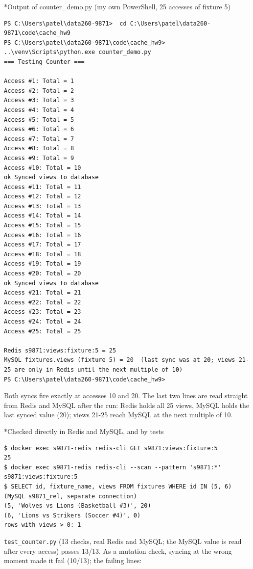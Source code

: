 \documentclass[11pt]{article}
\makeatletter
\renewcommand\subsection{\@startsection{subsection}{2}{\z@}{-2.2ex \@plus -1ex \@minus -.2ex}{0.8ex \@plus.2ex}{\normalfont\fontsize{12}{14.5}\selectfont\bfseries}}
\makeatother
\begin{document}
\subsection*{Output of counter\_demo.py (my own PowerShell, 25 accesses of fixture 5)}
\begingroup\lstset{basicstyle=\ttfamily\tiny}
\begin{lstlisting}
PS C:\Users\patel\data260-9871>  cd C:\Users\patel\data260-9871\code\cache_hw9
PS C:\Users\patel\data260-9871\code\cache_hw9> ..\venv\Scripts\python.exe counter_demo.py
=== Testing Counter ===

Access #1: Total = 1
Access #2: Total = 2
Access #3: Total = 3
Access #4: Total = 4
Access #5: Total = 5
Access #6: Total = 6
Access #7: Total = 7
Access #8: Total = 8
Access #9: Total = 9
Access #10: Total = 10
ok Synced views to database
Access #11: Total = 11
Access #12: Total = 12
Access #13: Total = 13
Access #14: Total = 14
Access #15: Total = 15
Access #16: Total = 16
Access #17: Total = 17
Access #18: Total = 18
Access #19: Total = 19
Access #20: Total = 20
ok Synced views to database
Access #21: Total = 21
Access #22: Total = 22
Access #23: Total = 23
Access #24: Total = 24
Access #25: Total = 25

Redis s9871:views:fixture:5 = 25
MySQL fixtures.views (fixture 5) = 20  (last sync was at 20; views 21-25 are only in Redis until the next multiple of 10)
PS C:\Users\patel\data260-9871\code\cache_hw9>
\end{lstlisting}
\endgroup
Both syncs fire exactly at accesses 10 and 20. The last two lines are read straight from Redis and MySQL after the run: Redis holds all 25 views, MySQL holds the last synced value (20); views 21-25 reach MySQL at the next multiple of 10.

\subsection*{Checked directly in Redis and MySQL, and by tests}
\begingroup\lstset{basicstyle=\ttfamily\tiny}
\begin{lstlisting}
$ docker exec s9871-redis redis-cli GET s9871:views:fixture:5
25
$ docker exec s9871-redis redis-cli --scan --pattern 's9871:*'
s9871:views:fixture:5
$ SELECT id, fixture_name, views FROM fixtures WHERE id IN (5, 6)   (MySQL s9871_rel, separate connection)
(5, 'Wolves vs Lions (Basketball #3)', 20)
(6, 'Lions vs Strikers (Soccer #4)', 0)
rows with views > 0: 1
\end{lstlisting}
\endgroup
\texttt{test\_\allowbreak{}counter.py} (13 checks, real Redis and MySQL; the MySQL value is read after every access) passes 13/13. As a mutation check, syncing at the wrong moment made it fail (10/13); the failing lines:
\end{document}
